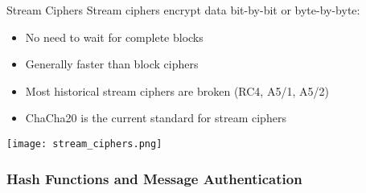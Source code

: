 \multend

\begin{concept}{Stream Ciphers}
    Stream ciphers encrypt data bit-by-bit or byte-by-byte:
    \begin{itemize}
        \item No need to wait for complete blocks
        \item Generally faster than block ciphers
        \item Most historical stream ciphers are broken (RC4, A5/1, A5/2)
        \item ChaCha20 is the current standard for stream ciphers
    \end{itemize}
    
\end{concept}

\texttt{[image: stream\_ciphers.png]}

\multend








\subsubsection{Hash Functions and Message Authentication}





